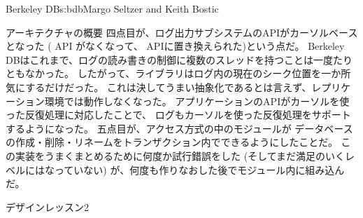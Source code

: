 \begin{aosachapter}{Berkeley DB}{s:bdb}{Margo Seltzer and Keith Bostic}
\begin{aosasect1}{アーキテクチャの概要}
四点目が、ログ出力サブシステムのAPIがカーソルベースとなった
( API がなくなって、 APIに置き換えられた)という点だ。
Berkeley DBはこれまで、ログの読み書きの制御に複数のスレッドを持つことは一度たりともなかった。
したがって、ライブラリはログ内の現在のシーク位置を一か所気にするだけだった。
これは決してうまい抽象化であるとは言えず、レプリケーション環境では動作しなくなった。
アプリケーションのAPIがカーソルを使った反復処理に対応したことで、
ログもカーソルを使った反復処理をサポートするようになった。
五点目が、アクセス方式の中のモジュールが
データベースの作成・削除・リネームをトランザクション内でできるようにしたことだ。
この実装をうまくまとめるために何度か試行錯誤をした
(そしてまだ満足のいくレベルにはなっていない)
が、何度も作りなおした後でモジュール内に組み込んだ。

\begin{aosabox}{デザインレッスン2}


\end{aosabox}
\end{aosasect1}
\end{aosachapter}
